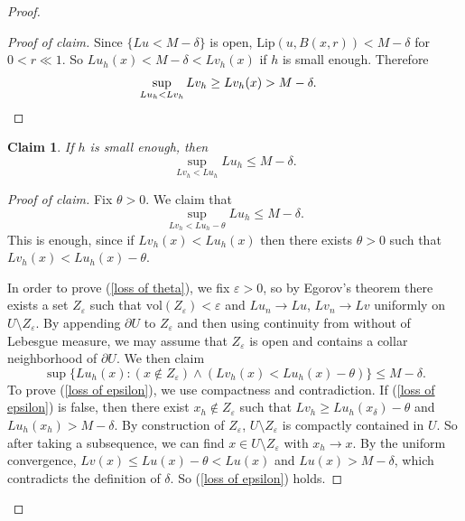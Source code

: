 \documentclass[reqno,11pt]{amsart}
\newcommand{\vol}{\mathrm{vol}}
\newcommand{\Lip}{\mathrm{Lip}}
\newtheorem{claim}{Claim}[theorem]
\theoremstyle{definition}
\numberwithin{equation}{section}
\begin{document}
\begin{proof}
\begin{proof}[Proof of claim]
Since $\{Lu < M - \delta\}$ is open, $\Lip(u, B(x, r)) < M - \delta$ for $0 < r \ll 1$.
So $Lu_h(x) < M - \delta < Lv_h(x)$ if $h$ is small enough.
Therefore
\begin{align*}
\sup_{Lu_h < Lv_h} Lv_h &\geq Lv_h(x) > M - \delta. \qedhere 
\end{align*}
\end{proof}

\begin{claim}
If $h$ is small enough, then 
$$\sup_{Lv_h < Lu_h} Lu_h \leq M - \delta.$$
\end{claim}
\begin{proof}[Proof of claim]
Fix $\theta > 0$. We claim that 
\begin{equation}\label{loss of theta}
\sup_{Lv_h < Lu_h - \theta} Lu_h \leq M - \delta.
\end{equation}
This is enough, since if $Lv_h(x) < Lu_h(x)$ then there exists $\theta > 0$ such that $Lv_h(x) < Lu_h(x) - \theta$.

In order to prove (\ref{loss of theta}), we fix $\varepsilon > 0$, so by Egorov's theorem there exists a set $Z_\varepsilon$ such that $\vol(Z_\varepsilon) < \varepsilon$ and $Lu_n \to Lu$, $Lv_n \to Lv$ uniformly on $U \setminus Z_\varepsilon$.
By appending $\partial U$ to $Z_\varepsilon$ and then using continuity from without of Lebesgue measure, we may assume that $Z_\varepsilon$ is open and contains a collar neighborhood of $\partial U$.
We then claim 
\begin{equation}\label{loss of epsilon}
\sup \{Lu_h(x): (x \notin Z_\varepsilon) \wedge (Lv_h(x) < Lu_h(x) - \theta)\} \leq M - \delta.
\end{equation}
To prove (\ref{loss of epsilon}), we use compactness and contradiction.
If (\ref{loss of epsilon}) is false, then there exist $x_h \notin Z_\varepsilon$ such that $Lv_h \geq Lu_h(x_\delta) - \theta$ and $Lu_h(x_h) > M - \delta$.
By construction of $Z_\varepsilon$, $U \setminus Z_\varepsilon$ is compactly contained in $U$.
So after taking a subsequence, we can find $x \in U \setminus Z_\varepsilon$ with $x_h \to x$.
By the uniform convergence, $Lv(x) \leq Lu(x) - \theta < Lu(x)$ and $Lu(x) > M - \delta$, which contradicts the definition of $\delta$.
So (\ref{loss of epsilon}) holds.


\end{proof}
\end{proof}
\end{document}
